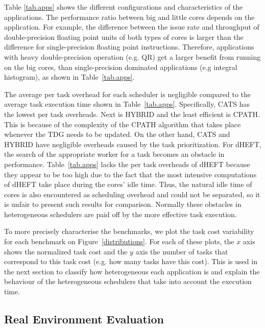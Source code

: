 Table \ref{tab.apps} shows the different configurations and characteristics of the applications.
The performance ratio between big and little cores depends on the application. For example, the difference between the issue rate and throughput of double-precision floating point units of both types of cores is larger than the difference for single-precision floating point instructions. Therefore, applications with heavy double-precision operation (e.g. QR) get a larger benefit from running on the big cores, than single-precision dominated applications (e.g integral histogram), as shown in Table~\ref{tab.apps}.

The average per task overhead for each scheduler is negligible compared to the average task execution time shown in Table~\ref{tab.apps}. Specifically, CATS has the lowest per task overheads. Next is HYBRID and the least efficient is CPATH. This is because of the complexity of the CPATH algorithm that takes place whenever the TDG needs to be updated.
On the other hand, CATS and HYBRID have negligible overheads caused by the task prioritization.
For dHEFT, the search of the appropriate worker for a task becomes an obstacle in performance. 
Table~\ref{tab.apps} lacks the per task overheads of dHEFT because they appear to be too high due to the fact that the most intensive computations of dHEFT take place during the cores' idle time.
Thus, the natural idle time of cores is also encountered as scheduling overhead and could not be separated, so it is unfair to present such results for comparison. 
Normally these obstacles in heterogeneous schedulers are paid off by the more effective task execution. 

To more precisely characterise the benchmarks, we plot the task cost variability for each benchmark on Figure~\ref{distributions}.
For each of these plots, the $x$ axis shows the normalized task cost and the $y$ axis the number of tasks that correspond to this task cost (e.g. how many tasks have this cost).
This is used in the next section to classify how heterogeneous each application is and explain the behaviour of the heterogeneous schedulers that take into account the execution time.

\subsection{Real Environment Evaluation}

